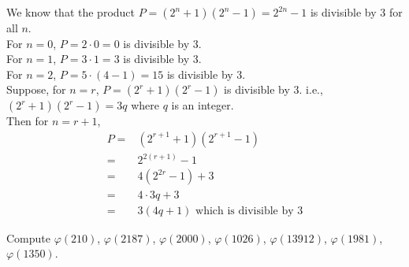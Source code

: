 \documentclass[12pt]{book}
\begin{document}
\begin{soln}
    We know that the product $ P=\left( 2^n+1 \right)\left( 2^n-1 \right)=2^{2n}-1 $ is divisible by 3 for all $ n $.\\
    For $ n=0 $, $ P=2\cdot0=0 $ is divisible by 3.\\
    For $ n=1 $, $ P=3\cdot1=3 $ is divisible by 3.\\
    For $ n=2 $, $ P=5\cdot(4-1)=15 $ is divisible by 3.\\
    Suppose, for $ n=r $, $ P=\left( 2^r+1 \right)\left( 2^r-1 \right) $ is divisible by 3. i.e., $ \left( 2^r+1 \right)\left( 2^r-1 \right)=3q $ where $ q $ is an integer.\\
    Then for $ n=r+1 $,
    \begin{align*}
        P= & \left( 2^{r+1}+1 \right)\left( 2^{r+1}-1 \right)    \\
        =  & 2^{2(r+1)}-1                                        \\
        =  & 4\left(2^{2r}-1\right)+3                            \\
        =  & 4\cdot3q+3                                          \\
        =  & 3\left( 4q+1 \right)\text{ which is divisible by }3
    \end{align*}
\end{soln}
\begin{qn}
    Compute $ \varphi(210) $, $ \varphi(2187) $, $ \varphi(2000) $, $ \varphi(1026) $, $ \varphi(13912) $, $ \varphi(1981) $, $ \varphi(1350) $.
\end{qn}
\end{document}

